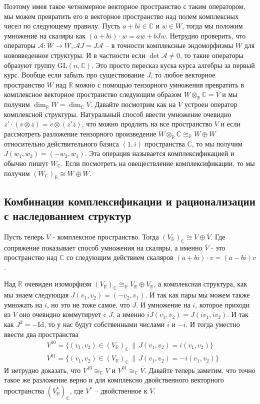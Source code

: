 \documentclass[a4paper, 12pt, oneside]{book}
\begin{document}
Поэтому имея такое четномерное векторное пространство с таким оператором, мы
можем превратить его в векторное пространство над полем комплексных чисел по
следующему правилу. Пусть $a+bi\in\mathbb C$ и $w\in W$, тогда мы положим
умножение на скаляры как $(a+bi)\cdot w=aw+bJw$. Нетрудно проверить, что операторы
$\mathcal A:W\rightarrow W, \mathcal AJ=J\mathcal A$ – в точности комплексные 
эндоморфизмы $W$ для нововведенное структуры. И в частности если $\det\mathcal A
\neq 0$, то такие операторы образуют группу $\text{GL}(n,\mathbb C)$. Это просто
пересказ куска курса алгебры за первый курс. Вообще если забыть про существование
$J$, то любое векторное пространство $W$ над $\mathbb R$ можно с помощью тензорного
умножения превратить в комплексное векторное пространство следующим образом
$W\otimes_{\mathbb R}\mathbb C=V$ и мы получим $\dim_{\mathbb R}W=\dim_{\mathbb C}V$.
Давайте посмотрим как на $V$ устроен оператор комплексной структуры. Натуральный
способ ввести умножение очевидно $z'\cdot(v\otimes z)=v\otimes(z'z)$, что можно
продлить на все пространство $V$ и если
рассмотреть разложение тензорного произведение $W\otimes_{\mathbb R}\mathbb C
\cong_{\mathbb R} W\oplus W$ относительно действительного базиса $(1,i)$ пространства
$\mathbb C$, то мы получим $J(w_1,w_2)=(-w_2,w_1)$. Эта операция называется комплексификацией
и обычно пишут $W_{\mathbb C}$. Если посмотреть на овеществление комплексификации,
то мы получим $(W_{\mathbb C})_{\mathbb R}\cong W\oplus W$.

\subsection{Комбинации комплексификации и рационализации с наследованием структур}
Пусть теперь $V$ - комплексное пространство. Тогда $(V_{\mathbb R})_{\mathbb C}
\cong V\oplus\overline V$. Где сопряжение показывает способ умножения на скаляры,
а именно $\overline V$ - это пространство над $\mathbb C$ со следующим действием
скаляров $(a+bi)\cdot v=(a-bi)v$.

Над $\mathbb R$ очевиден изоморфизм $(V_{\mathbb R})_{\mathbb C}\cong_{\mathbb R}
V_{\mathbb R}\oplus V_{\mathbb R}$, а комплексная структура, как мы знаем
следующая $J(v_1, v_2)=(-v_2, v_1)$. И так как пары мы можем также умножать на
$i$, но это не тоже самое, что $J$. И умножение на $i$, которое приходи из $V$ оно
очевидно коммутирует c $J$, а именно $iJ(v_1, v_2)=J(iv_1, iv_2)$. И так как
$J^2=-\text{Id}$, то у нас будут собственными числами $i$ и $-i$. И тогда уместно
ввести два пространства
\begin{align*}
    &V^{10}=\{(v_1,v_2)\in (V_{\mathbb R})_{\mathbb C}\,\|\,J(v_1,v_2)=i(v_1,v_2)\}\\
    &V^{01}=\{(v_1,v_2)\in (V_{\mathbb R})_{\mathbb C}\,\|\,J(v_1,v_2)=-i(v_1,v_2)\}
\end{align*}
И нетрудно доказать, что $V^{10}\cong_{\mathbb C} V$ и $V^{01}\cong_{\mathbb C}
\overline V$.
Давайте теперь заметим, что точно такое же разложение верно и для комплексно 
двойственного векторного пространства $(V^*_{\mathbb R})_{\mathbb C}$, где $V^*$
– двойственное к $V$.
\end{document}
